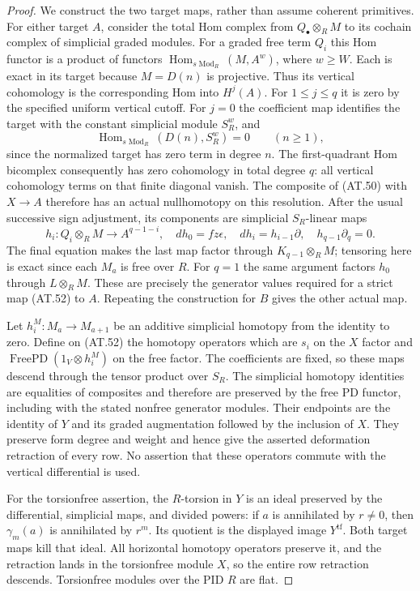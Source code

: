 \begin{proof}
We construct the two target maps, rather than assume
coherent primitives.  For either target $A$, consider
the total Hom complex from $Q_\bullet\otimes_R M$
to its cochain complex of simplicial graded modules.
For a graded free term $Q_i$ this Hom functor is a
product of functors
$\operatorname{Hom}_{s\operatorname{Mod}_R}(M,A^w)$,
where $w\geq W$.  Each is exact in its target because
$M=D(n)$ is projective.  Thus its vertical cohomology
is the corresponding Hom into $H^j(A)$.
For $1\leq j\leq q$ it is zero by the specified
uniform vertical cutoff.  For $j=0$ the coefficient
map identifies the target with the constant simplicial
module $S_R^w$, and
\[
 \operatorname{Hom}_{s\operatorname{Mod}_R}(D(n),S_R^w)=0
                      \qquad(n\geq1),
 \tag{AT.53}
\]
since the normalized target has zero term in degree $n$.
The first-quadrant Hom bicomplex consequently has zero
cohomology in total degree $q$: all vertical cohomology
terms on that finite diagonal vanish.
The composite of \textup{(AT.50)} with $X\to A$
therefore has an actual nullhomotopy on this resolution.
After the usual successive sign adjustment, its
components are simplicial $S_R$-linear maps
\[
 h_i:Q_i\otimes_R M\longrightarrow A^{q-1-i},
 \quad d h_0=fz\epsilon,\quad
 d h_i=h_{i-1}\partial,\quad h_{q-1}\partial_q=0.
 \tag{AT.54}
\]
The final equation makes the last map factor through
$K_{q-1}\otimes_R M$; tensoring here is exact since
each $M_a$ is free over $R$.
For $q=1$ the same argument factors $h_0$ through
$L\otimes_R M$.
These are precisely the generator values required
for a strict map \textup{(AT.52)} to $A$.
Repeating the construction for $B$ gives the other
actual map.

Let $h_i^M:M_a\to M_{a+1}$ be an additive simplicial
homotopy from the identity to zero.  Define on
\textup{(AT.52)} the homotopy operators which are
$s_i$ on the $X$ factor and
$\operatorname{FreePD}(1_V\otimes h_i^M)$ on the
free factor.  The coefficients are fixed, so these
maps descend through the tensor product over $S_R$.
The simplicial homotopy identities are equalities
of composites and therefore are preserved by the
free PD functor, including with the stated nonfree
generator modules.  Their endpoints are the identity
of $Y$ and its graded augmentation followed by the
inclusion of $X$.
They preserve form degree and weight and hence give
the asserted deformation retraction of every row.
No assertion that these operators commute with the
vertical differential is used.

For the torsionfree assertion, the $R$-torsion in
$Y$ is an ideal preserved by the differential,
simplicial maps, and divided powers: if $a$ is
annihilated by $r\ne0$, then $\gamma_m(a)$ is
annihilated by $r^m$.
Its quotient is the displayed image $Y^{\mathrm{tf}}$.
Both target maps kill that ideal.  All horizontal
homotopy operators preserve it, and the retraction
lands in the torsionfree module $X$, so the entire
row retraction descends.  Torsionfree modules over
the PID $R$ are flat.


\end{proof}
